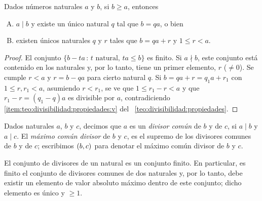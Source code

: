 \begin{teoDivisibilidad}%
	\label{teo:divisibilidad:algoritmo}
	Dados n\'umeros naturales $a$ y $b$, si $b\geq a$, entonces
	\begin{enumerate}[(A)]
		\item\label{item:teo:divisibilidad:algoritmo:1}
			$a\mid b$ y existe un \'unico natural $q$ tal que
			$b=qa$, o bien
		\item\label{item:teo:divisibilidad:algoritmo:2}
			existen \'unicos naturales $q$ y $r$ tales que
			$b=qa+r$ y $1\leq r<a$.
	\end{enumerate}
\end{teoDivisibilidad}

\begin{proof}
	El conjunto $\{b-ta\,:\,t\text{ natural, }ta\leq b\}$ es finito.
	Si $a\nmid b$, este conjunto est\'a contenido en los naturales y, por
	lo tanto, tiene un primer elemento, $r$ ($\neq 0$). Se cumple
	$r<a$ y $r=b-qa$ para cierto natural $q$. Si $b=qa+r=q_1a+r_1$
	con $1\leq r,r_1<a$, asumiendo $r<r_1$, se ve que
	$1\leq r_1-r<a$ y que $r_1-r=(q_1-q)a$ es divisible por $a$,
	contradiciendo \eqref{item:teo:divisibilidad:propiedades:v} del
	\teoname~\ref{teo:divisibilidad:propiedades}.
\end{proof}

\begin{defDivisibilidad}\label{def:mcd}
	Dados naturales $a$, $b$ y $c$, decimos que $a$ es un
	\emph{divisor com\'un} de $b$ y de $c$, si $a\mid b$ y $a\mid c$.
	El \emph{m\'aximo com\'un divisor} de $b$ y $c$, es el supremo de
	los divisores comunes de $b$ y de $c$; escribimos $\left({b,c}\right)_{}$ para
	denotar el m\'aximo com\'un divisor de $b$ y $c$.
\end{defDivisibilidad}

\begin{obsDivisibilidad}\label{obs:mcd}
	El conjunto de divisores de un natural es un conjunto finito.
	En particular, es finito el conjunto de divisores comunes de dos
	naturales y, por lo tanto, debe existir un elemento de valor
	absoluto m\'aximo dentro de este conjunto; dicho elemento es \'unico
	y $\geq 1$.
\end{obsDivisibilidad}

